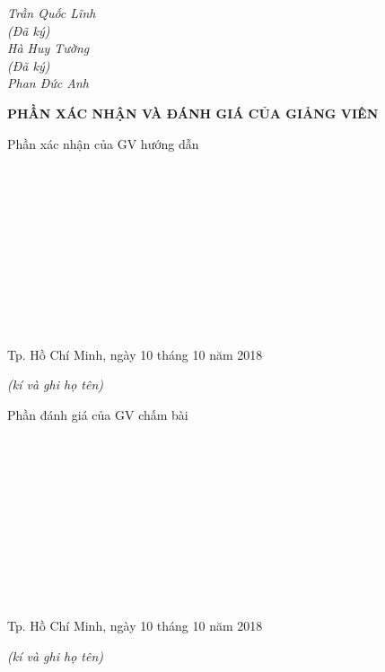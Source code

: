 \documentclass{report}
\begin{document}
\setlength{\parindent}{12cm}
\textit{Trần Quốc Lĩnh}\\

\vspace{1cm}
\setlength{\parindent}{13cm}
\textit{(Đã ký)}\\

\setlength{\parindent}{12.2cm}
\textit{Hà Huy Tường}\\

\vspace{1cm}
\setlength{\parindent}{13cm}
\textit{(Đã ký)}\\

\setlength{\parindent}{12.2cm}
\textit{Phan Đức Anh}\\


\newpage
\centerline{\textbf{PHẦN XÁC NHẬN VÀ ĐÁNH GIÁ CỦA GIẢNG VIÊN}}
\bigskip
\setlength{\parindent}{2.2cm}

\changefontsizes{13pt}
Phần xác nhận của GV hướng dẫn

\vspace{0.8cm}
\setlength{\parindent}{1cm}
\ \xfill{1pt} \

\bigskip
\ \xfill{1pt} \

\bigskip
\ \xfill{1pt} \

\bigskip
\ \xfill{1pt} \

\bigskip
\ \xfill{1pt} \

\bigskip
\ \xfill{1pt} \

\changefontsizes{12pt}
\setlength{\parindent}{8cm}
Tp. Hồ Chí Minh, ngày 10 tháng 10 năm 2018

\setlength{\parindent}{11cm}
\textit{(kí và ghi họ tên)}


\vspace{2.5cm}
\changefontsizes{13pt}
\setlength{\parindent}{2.2cm}
Phần đánh giá của GV chấm bài

\vspace{0.8cm}
\setlength{\parindent}{1cm}
\ \xfill{1pt} \

\bigskip
\ \xfill{1pt} \

\bigskip
\ \xfill{1pt} \

\bigskip
\ \xfill{1pt} \

\bigskip
\ \xfill{1pt} \

\bigskip
\ \xfill{1pt} \

\changefontsizes{12pt}
\setlength{\parindent}{8cm}
Tp. Hồ Chí Minh, ngày 10 tháng 10 năm 2018

\setlength{\parindent}{11cm}
\textit{(kí và ghi họ tên)}
\end{document}
